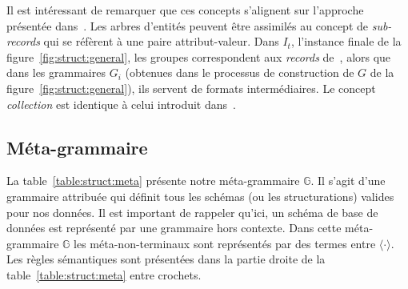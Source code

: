 Il est intéressant de remarquer que ces concepts s'alignent sur l'approche présentée dans~\cite{barretGenericAbstractionsData2021}.
Les arbres d'entités peuvent être assimilés au concept de \emph{sub-records} qui se réfèrent à une paire attribut-valeur.
Dans $I_t$, l'instance finale de la figure~\ref{fig:struct:general}, les groupes correspondent aux \emph{records} de~\cite{barretGenericAbstractionsData2021}, alors que dans les grammaires $G_i$ (obtenues dans le processus de construction de $G$ de la figure~\ref{fig:struct:general}), ils servent de formats intermédiaires.
Le concept \textit{collection} est identique à celui introduit dans~\cite{barretGenericAbstractionsData2021}.

\subsection{Méta-grammaire}

La table~\ref{table:struct:meta} présente notre méta-grammaire $\mathbb{G}$.
Il s'agit d'une grammaire attribuée qui définit tous les schémas (ou les structurations) valides pour nos données.
Il est important de rappeler qu'ici, un schéma de base de données est représenté par une grammaire hors contexte.
Dans cette méta-grammaire $\mathbb{G}$ les méta-non-terminaux sont représentés par des termes entre $\langle \cdot \rangle$.
Les règles sémantiques sont présentées dans la partie droite de la table~\ref{table:struct:meta} entre crochets.

